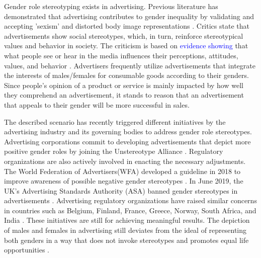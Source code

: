 \documentclass[twocolumn]{bmcart}\usepackage{lineno}
\begin{document}
Gender role stereotyping exists in advertising. Previous literature has demonstrated that advertising contributes to gender inequality by validating and accepting 'sexism' and distorted body image representations \cite{lysonski1985role,cortese1999provocateur,karpay2001deadly,lazar2006discover,lee2014gender}. 
Critics state that advertisements show social stereotypes, which, in turn, reinforce stereotypical values and behavior in society. The criticism is based on \textcolor{blue}{evidence showing} that what people see or hear in the media influences their perceptions, attitudes, values, and behavior \cite{ganahl2003content,orth2004men,eagly2000social,zawisza2010matters}. Advertisers frequently utilize advertisements that integrate the interests of males/females for consumable goods according to their genders. Since people's opinion of a product or service is mainly impacted by how well they comprehend an advertisement, it stands to reason that an advertisement that appeals to their gender will be more successful in sales\cite{tartaglia2015gender,neto2016gender}. 


The described scenario has recently triggered different initiatives by the advertising industry and its governing bodies to address gender role stereotypes. Advertising corporations commit to developing advertisements that depict more positive gender roles by joining the Unstereotype Alliance \cite{unstereotypealliance}. Regulatory organizations are also actively involved in enacting the necessary adjustments. The World Federation of Advertisers(WFA) developed a guideline in 2018 to improve awareness of possible negative gender stereotypes \cite{wfa2018progressive}. In June 2019, the UK's Advertising Standards Authority (ASA) banned gender stereotypes in advertisements \cite{ASAGenderStereotypes}. Advertising regulatory organizations have raised similar concerns in countries such as Belgium, Finland, France, Greece, Norway, South Africa, and India \cite{safronova2019gender}. These initiatives are still for achieving meaningful results. The depiction of males and females in advertising still deviates from the ideal of representing both genders in a way that does not invoke stereotypes and promotes equal life opportunities \cite{eisend2019gender,marshall2014overt}.
\end{document}
